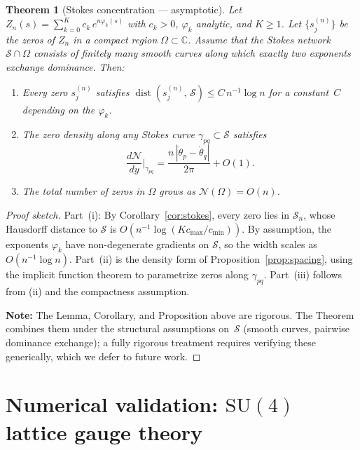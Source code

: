 \documentclass[12pt]{article}
\newtheorem{theorem}{Theorem}
\theoremstyle{definition}
\theoremstyle{remark}
\newcommand{\SU}{\mathrm{SU}}
\begin{document}
\begin{theorem}[Stokes concentration --- asymptotic]\label{thm:main}
Let $Z_n(s) = \sum_{k=0}^K c_k\,e^{n\varphi_k(s)}$ with $c_k > 0$,
$\varphi_k$ analytic, and $K \geq 1$.  Let $\{s_j^{(n)}\}$ be the
zeros of $Z_n$ in a compact region $\Omega \subset \mathbb{C}$.
Assume that the Stokes network $\mathcal{S} \cap \Omega$ consists of
finitely many smooth curves along which exactly two exponents exchange
dominance.  Then:
\begin{enumerate}
\item[(i)] Every zero $s_j^{(n)}$ satisfies
$\operatorname{dist}(s_j^{(n)},\, \mathcal{S}) \leq
C\,n^{-1}\log n$ for a constant~$C$ depending on the $\varphi_k$.

\item[(ii)] The zero density along any Stokes curve $\gamma_{pq}
\subset \mathcal{S}$ satisfies
\[
\frac{d\mathcal{N}}{dy}\bigg|_{\gamma_{pq}} =
\frac{n\,|\dot\theta_p - \dot\theta_q|}{2\pi} + O(1).
\]

\item[(iii)] The total number of zeros in $\Omega$ grows as
$\mathcal{N}(\Omega) = O(n)$.
\end{enumerate}
\end{theorem}

\begin{proof}[Proof sketch]
Part~(i): By Corollary~\ref{cor:stokes}, every zero lies in
$\mathcal{S}_n$, whose Hausdorff distance to $\mathcal{S}$
is $O(n^{-1}\log(Kc_{\max}/c_{\min}))$.  By assumption, the
exponents $\varphi_k$ have non-degenerate gradients on
$\mathcal{S}$, so the width scales as $O(n^{-1}\log n)$.
Part~(ii) is the density form of Proposition~\ref{prop:spacing},
using the implicit function theorem to parametrize zeros along
$\gamma_{pq}$.  Part~(iii) follows from (ii) and the compactness
assumption.

\textbf{Note:} The Lemma, Corollary, and Proposition above are
rigorous.  The Theorem combines them under the structural assumptions
on~$\mathcal{S}$ (smooth curves, pairwise dominance exchange);
a fully rigorous treatment requires verifying these generically,
which we defer to future work.
\end{proof}


\section{Numerical validation: $\SU(4)$ lattice gauge theory}
\label{sec:su4}
\end{document}

